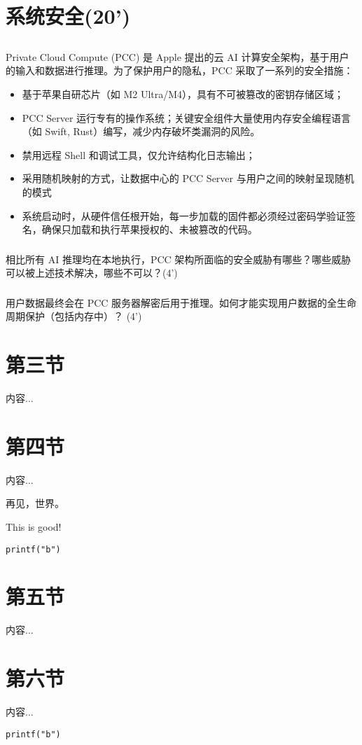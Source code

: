 \documentclass[a4paper,12pt]{article}
\begin{document}
\section{系统安全(20')}

\subsection{}

Private Cloud Compute (PCC) 是 Apple 提出的云 AI 计算安全架构，基于用户的输入和数据进行推理。为了保护用户的隐私，PCC 采取了一系列的安全措施：

\begin{itemize}
    \item 基于苹果自研芯片（如 M2 Ultra/M4），具有不可被篡改的密钥存储区域；
    \item PCC Server 运行专有的操作系统；关键安全组件大量使用内存安全编程语言（如 Swift, Rust）编写，减少内存破坏类漏洞的风险。
    \item 禁用远程 Shell 和调试工具，仅允许结构化日志输出；
    \item 采用随机映射的方式，让数据中心的 PCC Server 与用户之间的映射呈现随机的模式
    \item 系统启动时，从硬件信任根开始，每一步加载的固件都必须经过密码学验证签名，确保只加载和执行苹果授权的、未被篡改的代码。
\end{itemize}

\subsubsection{}

相比所有 AI 推理均在本地执行，PCC 架构所面临的安全威胁有哪些？哪些威胁可以被上述技术解决，哪些不可以？(4')


\subsubsection{}

用户数据最终会在 PCC 服务器解密后用于推理。如何才能实现用户数据的全生命周期保护（包括内存中）？ (4')

\section{第三节}
内容...

\section{第四节}
内容...

再见，世界。

This is good!

\verb|printf("b")|

\newpage

\section{第五节}
内容...

\section{第六节}
内容...

\verb|printf("b")|

\label{LastPage}
\end{document}
